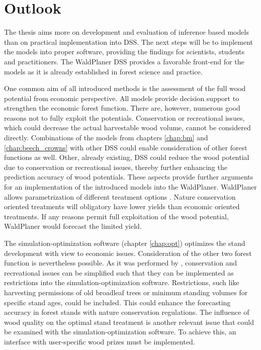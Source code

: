 \section{Outlook}
\label{sec:discussion:outlook}
The thesis aims more on development and evaluation of inference based models than on practical implementation into DSS. The next steps will be to implement the models into proper software, providing the findings for scientists, students and practitioners. The WaldPlaner DSS provides a favorable front-end for the models as it is already established in forest science and practice.

One common aim of all introduced methods is the assessment of the full wood potential from economic perspective. All models provide decision support to strengthen the economic forest function. There are, however, numerous good reasons not to fully exploit the potentials. Conservation or recreational issues, which could decrease the actual harvestable wood volume, cannot be considered directly. Combinations of the models from chapters \ref{chap:bm} and \ref{chap:beech_crowns} with other DSS could enable consideration of other forest functions as well. Other, already existing, DSS could reduce the wood potential due to conservation or recreational issues, thereby further enhancing the prediction accuracy of wood potentials. These aspects provide further arguments for an implementation of the introduced models into the WaldPlaner. WaldPlaner allows parametrization of different treatment options \citep[p. 90-93]{hansen_2014}. Nature conservation oriented treatments will obligatory have lower yields than economic oriented treatments. If any reasons permit full exploitation of the wood potential, WaldPlaner would forecast the limited yield.

The simulation-optimization software (chapter \ref{chap:opt}) optimizes the stand development with view to economic issues. Consideration of the other two forest function is nevertheless possible. As it was performed by \citet{yousefpour_2009}, conservation and recreational issues can be simplified such that they can be implemented as restrictions into the simulation-optimization software. Restrictions, such like harvesting permissions of old broadleaf trees or minimum standing volumes for specific stand ages, could be included. This could enhance the forecasting accuracy in forest stands with nature conservation regulations. The influence of wood quality on the optimal stand treatment is another relevant issue that could be examined with the simulation-optimization software. To achieve this, an interface with user-specific wood prizes must be implemented.

